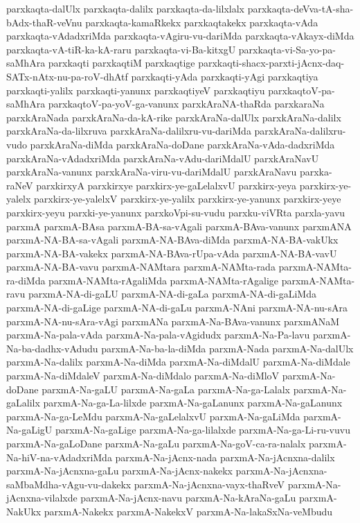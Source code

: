 {parxkaqta-dalUlx
parxkaqta-dalilx
parxkaqta-da-lilxlalx
parxkaqta-deVva-tA-sha-bAdx-thaR-veVnu
parxkaqta-kamaRkekx
parxkaqtakekx
parxkaqta-vAda
parxkaqta-vAdadxriMda
parxkaqta-vAgiru-vu-dariMda
parxkaqta-vAkayx-diMda
parxkaqta-vA-tiR-ka-kA-raru
parxkaqta-vi-Ba-kitxgU
parxkaqta-vi-Sa-yo-pa-saMhAra
parxkaqti
parxkaqtiM
parxkaqtige
parxkaqti-shacx-parxti-jAcnx-daq-SATx-nAtx-nu-pa-roV-dhAtf
parxkaqti-yAda
parxkaqti-yAgi
parxkaqtiya
parxkaqti-yalilx
parxkaqti-yanunx
parxkaqtiyeV
parxkaqtiyu
parxkaqtoV-pa-saMhAra
parxkaqtoV-pa-yoV-ga-vanunx
parxkAraNA-thaRda
parxkaraNa
parxkAraNada
parxkAraNa-da-kA-rike
parxkAraNa-dalUlx
parxkAraNa-dalilx
parxkAraNa-da-lilxruva
parxkAraNa-dalilxru-vu-dariMda
parxkAraNa-dalilxru-vudo
parxkAraNa-diMda
parxkAraNa-doDane
parxkAraNa-vAda-dadxriMda
parxkAraNa-vAdadxriMda
parxkAraNa-vAdu-dariMdalU
parxkAraNavU
parxkAraNa-vanunx
parxkAraNa-viru-vu-dariMdalU
parxkAraNavu
parxka-raNeV
parxkirxyA
parxkirxye
parxkirx-ye-gaLelalxvU
parxkirx-yeya
parxkirx-ye-yalelx
parxkirx-ye-yalelxV
parxkirx-ye-yalilx
parxkirx-ye-yanunx
parxkirx-yeye
parxkirx-yeyu
parxki-ye-yanunx
parxkoVpi-su-vudu
parxku-viVRta
parxla-yavu
parxmA
parxmA-BAsa
parxmA-BA-sa-vAgali
parxmA-BAva-vanunx
parxmANA
parxmA-NA-BA-sa-vAgali
parxmA-NA-BAva-diMda
parxmA-NA-BA-vakUkx
parxmA-NA-BA-vakekx
parxmA-NA-BAva-rUpa-vAda
parxmA-NA-BA-vavU
parxmA-NA-BA-vavu
parxmA-NAMtara
parxmA-NAMta-rada
parxmA-NAMta-ra-diMda
parxmA-NAMta-rAgaliMda
parxmA-NAMta-rAgalige
parxmA-NAMta-ravu
parxmA-NA-di-gaLU
parxmA-NA-di-gaLa
parxmA-NA-di-gaLiMda
parxmA-NA-di-gaLige
parxmA-NA-di-gaLu
parxmA-NAni
parxmA-NA-nu-sAra
parxmA-NA-nu-sAra-vAgi
parxmANa
parxmA-Na-BAva-vanunx
parxmANaM
parxmA-Na-pala-vAda
parxmA-Na-pala-vAgidudx
parxmA-Na-Pa-lavu
parxmA-Na-ba-dadhx-vAdudu
parxmA-Na-ba-la-diMda
parxmA-Nada
parxmA-Na-dalUlx
parxmA-Na-dalilx
parxmA-Na-diMda
parxmA-Na-diMdalU
parxmA-Na-diMdale
parxmA-Na-diMdaleV
parxmA-Na-diMdalo
parxmA-Na-diMloV
parxmA-Na-doDane
parxmA-Na-gaLU
parxmA-Na-gaLa
parxmA-Na-ga-Lalalx
parxmA-Na-gaLalilx
parxmA-Na-ga-La-lilxde
parxmA-Na-gaLanunx
parxmA-Na-gaLanunx
parxmA-Na-ga-LeMdu
parxmA-Na-gaLelalxvU
parxmA-Na-gaLiMda
parxmA-Na-gaLigU
parxmA-Na-gaLige
parxmA-Na-ga-lilalxde
parxmA-Na-ga-Li-ru-vuvu
parxmA-Na-gaLoDane
parxmA-Na-gaLu
parxmA-Na-goV-ca-ra-nalalx
parxmA-Na-hiV-na-vAdadxriMda
parxmA-Na-jAcnx-nada
parxmA-Na-jAcnxna-dalilx
parxmA-Na-jAcnxna-gaLu
parxmA-Na-jAcnx-nakekx
parxmA-Na-jAcnxna-saMbaMdha-vAgu-vu-dakekx
parxmA-Na-jAcnxna-vayx-thaRveV
parxmA-Na-jAcnxna-vilalxde
parxmA-Na-jAcnx-navu
parxmA-Na-kAraNa-gaLu
parxmA-NakUkx
parxmA-Nakekx
parxmA-NakekxV
parxmA-Na-lakaSxNa-veMbudu
}

